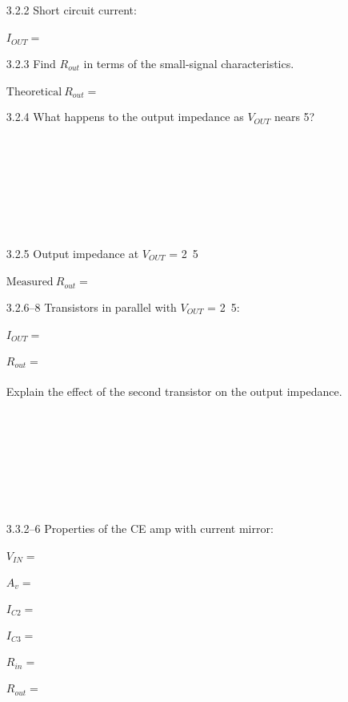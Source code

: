 \documentclass{article}
\begin{document}
\begin{enumerate}
	\item[3.2.2] Short circuit current: \\ ~ \\
		$\boxed{I_{OUT}   = ~~~~~~~~~~~~~~~~~~~~~~~}$
	
	\item[3.2.3] Find $R_{out}$ in terms of the small-signal characteristics. \\~\\

		$\boxed{\text{Theoretical}~R_{out}   = ~~~~~~~~~~~~~~~~~~~~~~~}$
	
	\item[3.2.4] What happens to the output impedance as $V_{OUT}$ nears \unit{5}{\volt}?
		\\~\\~\\~\\~\\~\\~\\~\\
	
	\item[3.2.5] Output impedance at $V_{OUT}$ = \unit{2.5}{\volt} \\ ~ \\
		$\boxed{\text{Measured}~R_{out}   = ~~~~~~~~~~~~~~~~~~~~~~~}$
	
	\item[3.2.6--8] Transistors in parallel with $V_{OUT}$ = \unit{2.5}{\volt}: \\ ~ \\
		$\boxed{I_{OUT}   = ~~~~~~~~~~~~~~~~~~~~~~~}$ \\ ~ \\
		$\boxed{R_{out}   = ~~~~~~~~~~~~~~~~~~~~~~~}$ \\ ~ \\
		Explain the effect of the second transistor on the output impedance.
		\\~\\~\\~\\~\\~\\~\\~\\

	\item[3.3.2--6] Properties of the CE amp with current mirror: \\ ~ \\
		$\boxed{V_{IN}   = ~~~~~~~~~~~~~~~~~~~~~~~}$ \\ ~ \\
		$\boxed{A_{v}    = ~~~~~~~~~~~~~~~~~~~~~~~}$ \\ ~ \\
		$\boxed{I_{C2}	 = ~~~~~~~~~~~~~~~~~~~~~~~}$ \\ ~ \\
		$\boxed{I_{C3}	 = ~~~~~~~~~~~~~~~~~~~~~~~}$ \\ ~ \\		
    	$\boxed{R_{in}   = ~~~~~~~~~~~~~~~~~~~~~~~}$ \\ ~ \\
    	$\boxed{R_{out}  = ~~~~~~~~~~~~~~~~~~~~~~~}$


\end{enumerate}
\end{document}

